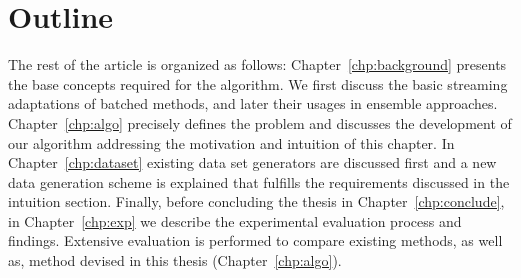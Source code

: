 \section{Outline}
The rest of the article is organized as follows: Chapter~\ref{chp:background} presents the base concepts required for the algorithm. We first discuss the basic streaming adaptations of batched methods, and later their usages in ensemble approaches. Chapter~\ref{chp:algo} precisely defines the problem and discusses the development of our algorithm addressing the motivation and intuition of this chapter. In Chapter~\ref{chp:dataset} existing data set generators are discussed first and a new data generation scheme is explained that fulfills the requirements discussed in the intuition section. Finally, before concluding the thesis in Chapter~\ref{chp:conclude}, in Chapter~\ref{chp:exp} we describe the experimental evaluation process and findings. Extensive evaluation is performed to compare existing methods, as well as, method devised in this thesis  (Chapter~\ref{chp:algo}). 

